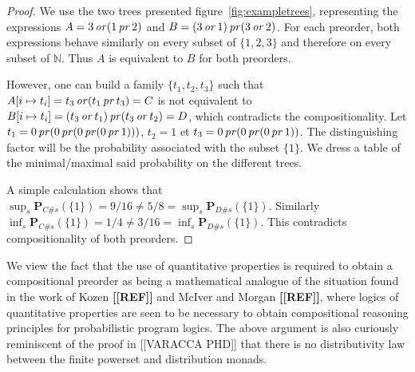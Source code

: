 \begin{proof}
    We use the two trees presented figure~\ref{fig:exampletrees},
    representing the expressions $A = 3 \operatorname{\mathit{or}} (1 \operatorname{\mathit{pr}} 2)$
    and $B = (3 \operatorname{\mathit{or}} 1) \operatorname{\mathit{pr}} (3 \operatorname{\mathit{or}} 2)$.
    For each preorder, both expressions behave similarly on every subset of $\{ 1, 2, 3 \}$ 
    and therefore on every subset of $\mathbb{N}$. Thus $A$ is equivalent 
    to $B$ for both preorders.

    However, one can build a family $\{ t_1, t_2, t_3\}$ such that 
    $A[ i \mapsto t_i] = t_3 \operatorname{\mathit{or}} (t_1 \operatorname{\mathit{pr}} t_3) = C$ is not equivalent to 
    $B[ i\mapsto t_i] = (t_3 \operatorname{\mathit{or}} t_1) \operatorname{\mathit{pr}} (t_3 \operatorname{\mathit{or}} t_2) = D$,
    which contradicts the compositionality.
    Let $t_1 = 0 \operatorname{\mathit{pr}} (0 \operatorname{\mathit{pr}} (0 \operatorname{\mathit{pr}} (0 \operatorname{\mathit{pr}} 1)))$,
    $t_2 = 1$ et $t_3 = 0 \operatorname{\mathit{pr}} (0 \operatorname{\mathit{pr}} (0 \operatorname{\mathit{pr}} 1))$. The distinguishing 
    factor will be the probability associated with the subset $\{ 1 \}$.
    We dress a table of the minimal/maximal said probability on the different 
    trees.

    A simple calculation shows that $\sup_s  \mathbf{P}_{C\#s} (\{1\}) = 9/16
    \neq 5/8 = \sup_s \mathbf{P}_{D\#s} (\{ 1\})$. Similarly
    $\inf_s  \mathbf{P}_{C\#s} (\{1\}) = 1/4 \neq 3/16 =
     \inf_s \mathbf{P}_{D \#s } (\{1\})$.
     This contradicts compositionality of both preorders.
    
\end{proof}



We view the fact that the use of quantitative properties is required to obtain a compositional preorder as being
a mathematical analogue of the situation found in the work of Kozen
\textbf{[[REF]]} and McIver and Morgan \textbf{[[REF]]}, where 
logics of quantitative properties are seen to be necessary to obtain compositional reasoning principles for 
probabilistic program logics. The above argument is also curiously  reminiscent of the proof in [[VARACCA PHD]]
that there is no distributivity law between the finite powerset and distribution monads.


